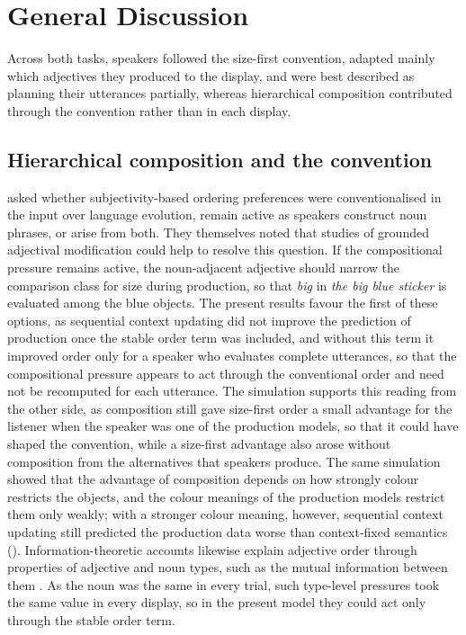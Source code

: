 \documentclass[10pt,a4paper,fleqn]{article}
\begin{document}
\FloatBarrier

\section{General Discussion}
\label{sec:discussion}

Across both tasks, speakers followed the size-first convention, adapted mainly which adjectives they produced to the display, and were best described as planning their utterances partially, whereas hierarchical composition contributed through the convention rather than in each display.

\subsection{Hierarchical composition and the convention}

\citet[p.~7:19]{scontras2019grammatical} asked whether subjectivity-based ordering preferences were conventionalised in the input over language evolution, remain active as speakers construct noun phrases, or arise from both.
They themselves noted that studies of grounded adjectival modification could help to resolve this question.
If the compositional pressure remains active, the noun-adjacent adjective should narrow the comparison class for size during production, so that \emph{big} in \emph{the big blue sticker} is evaluated among the blue objects.
The present results favour the first of these options, as sequential context updating did not improve the prediction of production once the stable order term was included, and without this term it improved order only for a speaker who evaluates complete utterances, so that the compositional pressure appears to act through the conventional order and need not be recomputed for each utterance.
The simulation supports this reading from the other side, as composition still gave size-first order a small advantage for the listener when the speaker was one of the production models, so that it could have shaped the convention, while a size-first advantage also arose without composition from the alternatives that speakers produce.
The same simulation showed that the advantage of composition depends on how strongly colour restricts the objects, and the colour meanings of the production models restrict them only weakly; with a stronger colour meaning, however, sequential context updating still predicted the production data worse than context-fixed semantics ().
Information-theoretic accounts likewise explain adjective order through properties of adjective and noun types, such as the mutual information between them \citep{Hahn_information_2018,futrell-etal-2020-determines}.
As the noun was the same in every trial, such type-level pressures took the same value in every display, so in the present model they could act only through the stable order term.
\end{document}
